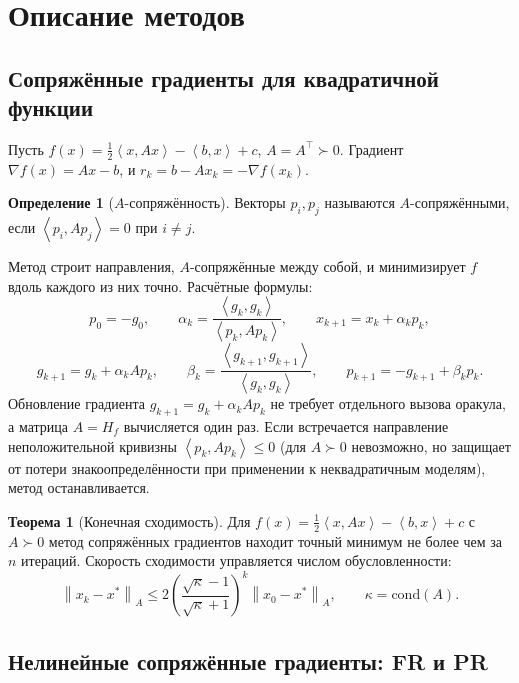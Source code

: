 \documentclass[a4paper,12pt]{article}
\newcommand{\norm}[1]{\left\|#1\right\|}
\newcommand{\grad}{\nabla}
\newcommand{\inner}[2]{\left\langle #1, #2 \right\rangle}
\theoremstyle{definition}
\newtheorem{definition}{Определение}[section]
\newtheorem{theorem}{Теорема}[section]
\begin{document}
\section{Описание методов}

\subsection{Сопряжённые градиенты для квадратичной функции}

Пусть $f(x) = \tfrac12 \inner{x}{Ax} - \inner{b}{x} + c$, $A = A^\top \succ 0$. Градиент
$\grad f(x) = Ax - b$, и $r_k = b - Ax_k = -\grad f(x_k)$.

\begin{definition}[$A$-сопряжённость]
    Векторы $p_i, p_j$ называются $A$-сопряжёнными, если $\inner{p_i}{A p_j} = 0$ при $i \neq j$.
\end{definition}

Метод строит направления, $A$-сопряжённые между собой, и минимизирует $f$ вдоль каждого из них
точно. Расчётные формулы:
\[
    p_0 = -g_0, \qquad
    \alpha_k = \frac{\inner{g_k}{g_k}}{\inner{p_k}{A p_k}}, \qquad
    x_{k+1} = x_k + \alpha_k p_k,
\]
\[
    g_{k+1} = g_k + \alpha_k A p_k, \qquad
    \beta_k = \frac{\inner{g_{k+1}}{g_{k+1}}}{\inner{g_k}{g_k}}, \qquad
    p_{k+1} = -g_{k+1} + \beta_k p_k.
\]
Обновление градиента $g_{k+1} = g_k + \alpha_k A p_k$ не требует отдельного вызова оракула,
а матрица $A = H_f$ вычисляется один раз. Если встречается направление неположительной кривизны
$\inner{p_k}{A p_k} \leq 0$ (для $A \succ 0$ невозможно, но защищает от потери знакоопределённости
при применении к неквадратичным моделям), метод останавливается.

\begin{theorem}[Конечная сходимость]
    Для $f(x) = \tfrac12 \inner{x}{Ax} - \inner{b}{x} + c$ с $A \succ 0$ метод сопряжённых
    градиентов находит точный минимум не более чем за $n$ итераций. Скорость сходимости
    управляется числом обусловленности:
    \[
        \norm{x_k - x^*}_A \leq 2\left(\frac{\sqrt{\kappa} - 1}{\sqrt{\kappa} + 1}\right)^{k}
        \norm{x_0 - x^*}_A, \qquad \kappa = \mathrm{cond}(A).
    \]
\end{theorem}

\subsection{Нелинейные сопряжённые градиенты: FR и PR}
\end{document}
